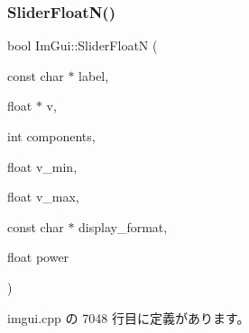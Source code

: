 \subsubsection{\texorpdfstring{Slider\+Float\+N()}{SliderFloatN()}}
{\footnotesize\ttfamily bool Im\+Gui\+::\+Slider\+FloatN (\begin{DoxyParamCaption}\item[{const char $\ast$}]{label,  }\item[{float $\ast$}]{v,  }\item[{int}]{components,  }\item[{float}]{v\+\_\+min,  }\item[{float}]{v\+\_\+max,  }\item[{const char $\ast$}]{display\+\_\+format,  }\item[{float}]{power }\end{DoxyParamCaption})}



 imgui.\+cpp の 7048 行目に定義があります。

